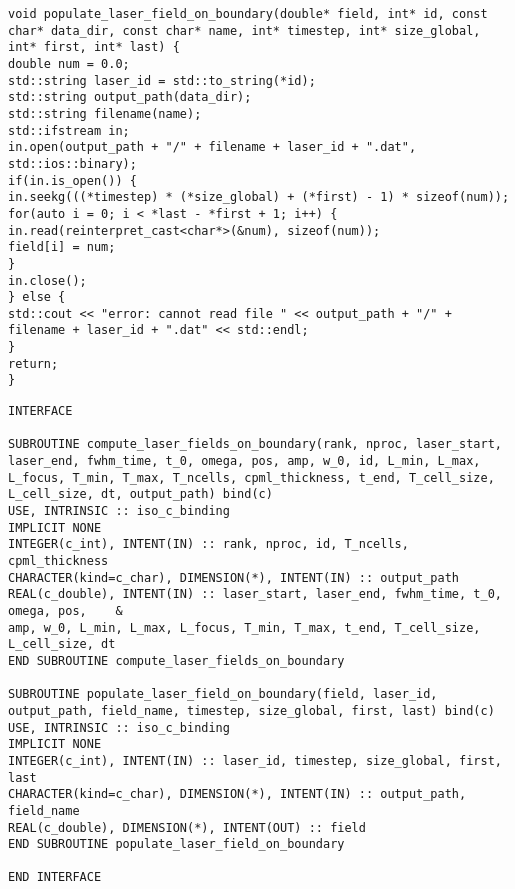 \begin{lstlisting}[style=CXX, caption=Extern C++ function to fill Fortran arrays with laser fields dumped in binary file]
void populate_laser_field_on_boundary(double* field, int* id, const char* data_dir, const char* name, int* timestep, int* size_global, int* first, int* last) {
double num = 0.0;
std::string laser_id = std::to_string(*id);
std::string output_path(data_dir);
std::string filename(name);
std::ifstream in;
in.open(output_path + "/" + filename + laser_id + ".dat", std::ios::binary);
if(in.is_open()) {
in.seekg(((*timestep) * (*size_global) + (*first) - 1) * sizeof(num));
for(auto i = 0; i < *last - *first + 1; i++) {
in.read(reinterpret_cast<char*>(&num), sizeof(num));
field[i] = num;
}
in.close();
} else {
std::cout << "error: cannot read file " << output_path + "/" + filename + laser_id + ".dat" << std::endl;
}
return;
}
\end{lstlisting}

\begin{lstlisting}[style=FORTRAN, caption=Fortran interfaces for C++ library functions]
INTERFACE

SUBROUTINE compute_laser_fields_on_boundary(rank, nproc, laser_start, laser_end, fwhm_time, t_0, omega, pos, amp, w_0, id, L_min, L_max, L_focus, T_min, T_max, T_ncells, cpml_thickness, t_end, T_cell_size, L_cell_size, dt, output_path) bind(c)
USE, INTRINSIC :: iso_c_binding
IMPLICIT NONE
INTEGER(c_int), INTENT(IN) :: rank, nproc, id, T_ncells, cpml_thickness
CHARACTER(kind=c_char), DIMENSION(*), INTENT(IN) :: output_path
REAL(c_double), INTENT(IN) :: laser_start, laser_end, fwhm_time, t_0, omega, pos,    &
amp, w_0, L_min, L_max, L_focus, T_min, T_max, t_end, T_cell_size, L_cell_size, dt
END SUBROUTINE compute_laser_fields_on_boundary

SUBROUTINE populate_laser_field_on_boundary(field, laser_id, output_path, field_name, timestep, size_global, first, last) bind(c)
USE, INTRINSIC :: iso_c_binding
IMPLICIT NONE
INTEGER(c_int), INTENT(IN) :: laser_id, timestep, size_global, first, last
CHARACTER(kind=c_char), DIMENSION(*), INTENT(IN) :: output_path, field_name
REAL(c_double), DIMENSION(*), INTENT(OUT) :: field
END SUBROUTINE populate_laser_field_on_boundary

END INTERFACE
\end{lstlisting}

